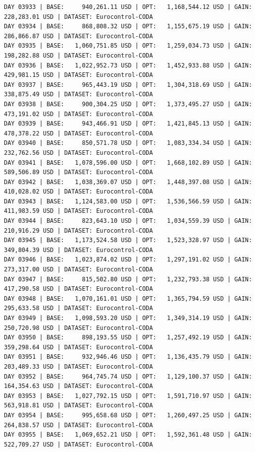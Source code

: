 \documentclass[11pt,a4paper]{article}
\begin{document}
\begin{verbatim}
DAY 03933 | BASE:     940,261.11 USD | OPT:   1,168,544.12 USD | GAIN: 228,283.01 USD | DATASET: Eurocontrol-CODA
DAY 03934 | BASE:     868,808.32 USD | OPT:   1,155,675.19 USD | GAIN: 286,866.87 USD | DATASET: Eurocontrol-CODA
DAY 03935 | BASE:   1,060,751.85 USD | OPT:   1,259,034.73 USD | GAIN: 198,282.88 USD | DATASET: Eurocontrol-CODA
DAY 03936 | BASE:   1,022,952.73 USD | OPT:   1,452,933.88 USD | GAIN: 429,981.15 USD | DATASET: Eurocontrol-CODA
DAY 03937 | BASE:     965,443.19 USD | OPT:   1,304,318.69 USD | GAIN: 338,875.49 USD | DATASET: Eurocontrol-CODA
DAY 03938 | BASE:     900,304.25 USD | OPT:   1,373,495.27 USD | GAIN: 473,191.02 USD | DATASET: Eurocontrol-CODA
DAY 03939 | BASE:     943,466.91 USD | OPT:   1,421,845.13 USD | GAIN: 478,378.22 USD | DATASET: Eurocontrol-CODA
DAY 03940 | BASE:     850,571.78 USD | OPT:   1,083,334.34 USD | GAIN: 232,762.56 USD | DATASET: Eurocontrol-CODA
DAY 03941 | BASE:   1,078,596.00 USD | OPT:   1,668,102.89 USD | GAIN: 589,506.89 USD | DATASET: Eurocontrol-CODA
DAY 03942 | BASE:   1,038,369.07 USD | OPT:   1,448,397.08 USD | GAIN: 410,028.02 USD | DATASET: Eurocontrol-CODA
DAY 03943 | BASE:   1,124,583.00 USD | OPT:   1,536,566.59 USD | GAIN: 411,983.59 USD | DATASET: Eurocontrol-CODA
DAY 03944 | BASE:     823,643.10 USD | OPT:   1,034,559.39 USD | GAIN: 210,916.29 USD | DATASET: Eurocontrol-CODA
DAY 03945 | BASE:   1,173,524.58 USD | OPT:   1,523,328.97 USD | GAIN: 349,804.39 USD | DATASET: Eurocontrol-CODA
DAY 03946 | BASE:   1,023,874.02 USD | OPT:   1,297,191.02 USD | GAIN: 273,317.00 USD | DATASET: Eurocontrol-CODA
DAY 03947 | BASE:     815,502.80 USD | OPT:   1,232,793.38 USD | GAIN: 417,290.58 USD | DATASET: Eurocontrol-CODA
DAY 03948 | BASE:   1,070,161.01 USD | OPT:   1,365,794.59 USD | GAIN: 295,633.58 USD | DATASET: Eurocontrol-CODA
DAY 03949 | BASE:   1,098,593.20 USD | OPT:   1,349,314.19 USD | GAIN: 250,720.98 USD | DATASET: Eurocontrol-CODA
DAY 03950 | BASE:     898,193.55 USD | OPT:   1,257,492.19 USD | GAIN: 359,298.64 USD | DATASET: Eurocontrol-CODA
DAY 03951 | BASE:     932,946.46 USD | OPT:   1,136,435.79 USD | GAIN: 203,489.33 USD | DATASET: Eurocontrol-CODA
DAY 03952 | BASE:     964,745.74 USD | OPT:   1,129,100.37 USD | GAIN: 164,354.63 USD | DATASET: Eurocontrol-CODA
DAY 03953 | BASE:   1,027,792.15 USD | OPT:   1,591,710.97 USD | GAIN: 563,918.81 USD | DATASET: Eurocontrol-CODA
DAY 03954 | BASE:     995,658.68 USD | OPT:   1,260,497.25 USD | GAIN: 264,838.57 USD | DATASET: Eurocontrol-CODA
DAY 03955 | BASE:   1,069,652.21 USD | OPT:   1,592,361.48 USD | GAIN: 522,709.27 USD | DATASET: Eurocontrol-CODA

\end{verbatim}
\end{document}
